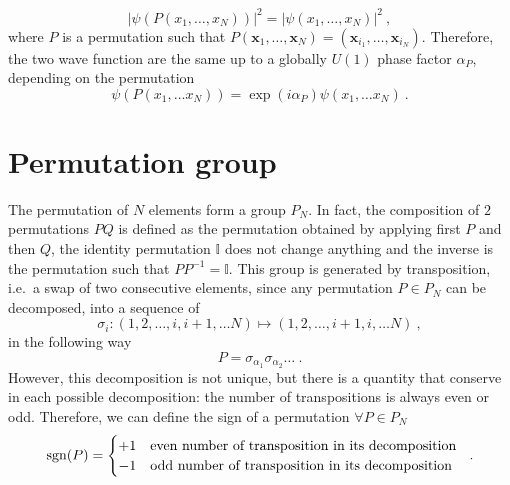     \begin{equation*}
        |\psi(P(x_1, \ldots, x_N))|^2 = |\psi(x_1, \ldots, x_N)|^2 ~,
    \end{equation*}
    where $P$ is a permutation such that $P(\mathbf x_1, \ldots, \mathbf x_N) = (\mathbf x_{i_1}, \ldots, \mathbf x_{i_N})$. Therefore, the two wave function are the same up to a globally $U(1)$ phase factor $\alpha_P$, depending on the permutation
    \begin{equation}\label{perm:phase}
        \psi(P(x_1, \ldots x_N)) = \exp(i \alpha_P) \psi (x_1, \ldots x_N) ~.
    \end{equation}

\section{Permutation group}

    The permutation of $N$ elements form a group $P_N$. In fact, the composition of $2$ permutations $PQ$ is defined as the permutation obtained by applying first $P$ and then $Q$, the identity permutation $\mathbb I$ does not change anything and the inverse is the permutation such that $P P^{-1} = \mathbb I$. This group is generated by transposition, i.e.~a swap of two consecutive elements, since any permutation $P \in P_N$ can be decomposed, into a sequence of 
    \begin{equation*}
        \sigma_i \colon (1,2,\ldots, i, i+1, \ldots N) \mapsto (1,2,\ldots, i+1, i, \ldots N) ~,
    \end{equation*}
    in the following way 
    \begin{equation}\label{perm:dec}
        P = \sigma_{\alpha_1} \sigma_{\alpha_2} \ldots ~.
    \end{equation}
    However, this decomposition is not unique, but there is a quantity that conserve in each possible decomposition: the number of transpositions is always even or odd. Therefore, we can define the sign of a permutation $\forall P \in P_N$
    \begin{equation*}
        \operatorname{sgn}(P) = \begin{cases}
            + 1 & \textnormal{even number of transposition in its decomposition } \\
            - 1 & \textnormal{odd number of transposition in its decomposition } \\
        \end{cases} ~.
    \end{equation*}

